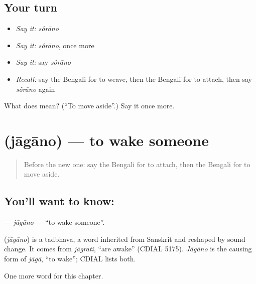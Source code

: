 \subsection*{Your turn}
\begin{itemize}
\raggedright
  \item \emph{Say it:} \emph{sôrāno}
  \item \emph{Say it:} \emph{sôrāno}, once more
  \item \emph{Say it:} say \emph{sôrāno}
  \item \emph{Recall:} say the Bengali for to weave, then the Bengali for to attach, then say \emph{sôrāno} again
\end{itemize}

\begin{tcolorbox}[breakable,colback=teal!4,colframe=teal!35!black,title={Before you move on}]
What does  mean? (\textquotedblleft{}To move aside\textquotedblright{}.) Say it once more.
\end{tcolorbox}
\section[\texorpdfstring{\bn{জাগানো} (jāgāno)}{জাগানো (jāgāno)}]{ (jāgāno) — to wake someone}

\label{lesson:BN-C102-jagano}



\begin{quote}
Before the new one: say the Bengali for to attach, then the Bengali for to move aside.
\end{quote}

\subsection*{You'll want to know: }
\textbf{} — \emph{jāgāno} — \textquotedblleft{}to wake someone\textquotedblright{}.

\begin{cousinweb}
\textbf{} (\emph{jāgāno}) is a tadbhava, a word inherited from Sanskrit and reshaped by sound change. It comes from \emph{jāgrati}, \textquotedblleft{}are awake\textquotedblright{} (CDIAL 5175). \emph{Jāgāno} is the causing form of \emph{jāgā}, \textquotedblleft{}to wake\textquotedblright{}; CDIAL lists both.
\end{cousinweb}

\begin{grammarlens}[title={What you've built}]
One more word for this chapter.
\end{grammarlens}

